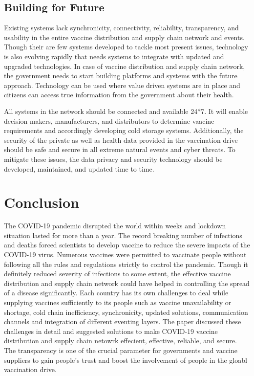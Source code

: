 \documentclass{article}
\begin{document}
\subsection{Building for Future}

Existing systems lack synchronicity, connectivity, reliability, transparency, and usability in the entire vaccine distribution and supply chain network and events. Though their are few systems developed to tackle most present issues, technology is also evolving rapidly that needs systems to integrate with updated and upgraded technologies. In case of vaccine distribution and supply chain network, the government needs to start building platforms and systems with the future approach. Technology can be used where value driven systems are in place and citizens can access true information from the government about their health.	

All systems in the network should be connected and available 24*7. It will enable decision makers, manufacturers, and distributors to determine vaacine requirements and accordingly developing cold storage systems. Additionally, the security of the private as well as health data provided in the vaccination drive should be safe and secure in all extreme natural events and cyber threats. To mitigate these issues, the data privacy and security technology should be developed, maintained, and updated time to time.  
  
\section{Conclusion}
The COVID-19 pandemic disrupted the world within weeks and lockdown situation lasted for more than a year. The record breaking number of infections and deaths forced scientists to develop vaccine to reduce the severe impacts of the COVID-19 virus. Numerous vaccines were permitted to vaccinate people without following all the rules and regulations strictly to control the pandemic. Though it definitely reduced severity of infections to some extent, the effective vaccine distribution and supply chain network could have helped in controlling the spread of a disease significantly. Each country has its own challenges to deal while supplying vaccines sufficiently to its people such as vaccine unavailability or shortage, cold chain inefficiency, synchronicity, updated solutions, communication channels and integration of different eventing layers. The paper discussed these challenges in detail and suggested solutions to make COVID-19 vaccine distribution and supply chain netowrk effecient, effective, reliable, and secure. The transparency is one of the crucial parameter for governments and vaccine suppliers to gain people's trust and boost the involvement of people in the gloabl vaccination drive.    



\end{document}
